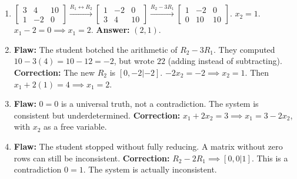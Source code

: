 \documentclass[11pt]{article}
\begin{document}
\begin{enumerate}[label=\textbf{Sol 1.1.\arabic*}]
    \item $\left[\begin{array}{cc|c} 3 & 4 & 10 \\ 1 & -2 & 0 \end{array}\right] \xrightarrow{R_1 \leftrightarrow R_2} \left[\begin{array}{cc|c} 1 & -2 & 0 \\ 3 & 4 & 10 \end{array}\right] \xrightarrow{R_2-3R_1} \left[\begin{array}{cc|c} 1 & -2 & 0 \\ 0 & 10 & 10 \end{array}\right]$. $x_2=1$. $x_1 - 2 = 0 \implies x_1 = 2$. \textbf{Answer:} $(2, 1)$.
    \item \textbf{Flaw:} The student botched the arithmetic of $R_2 - 3R_1$. They computed $10 - 3(4) = 10 - 12 = -2$, but wrote $22$ (adding instead of subtracting). \textbf{Correction:} The new $R_2$ is $[0, -2 | -2]$. $-2x_2 = -2 \implies x_2 = 1$. Then $x_1 + 2(1) = 4 \implies x_1 = 2$.
    \item \textbf{Flaw:} $0=0$ is a universal truth, not a contradiction. The system is consistent but underdetermined. \textbf{Correction:} $x_1 + 2x_2 = 3 \implies x_1 = 3 - 2x_2$, with $x_2$ as a free variable.
    \item \textbf{Flaw:} The student stopped without fully reducing. A matrix without zero rows can still be inconsistent. \textbf{Correction:} $R_2 - 2R_1 \implies [0, 0 | 1]$. This is a contradiction $0=1$. The system is actually inconsistent.
\end{enumerate}
\end{document}
